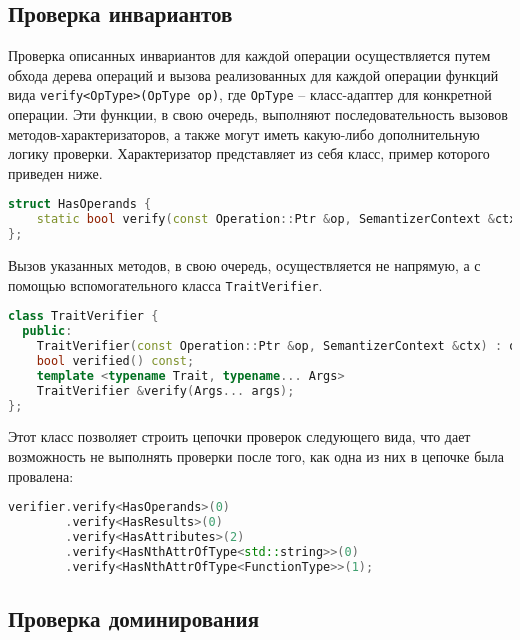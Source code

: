 \subsection{Проверка инвариантов}

Проверка описанных инвариантов для каждой операции осуществляется путем обхода дерева операций и вызова реализованных для каждой операции функций вида \verb|verify<OpType>(OpType op)|, где \verb|OpType| -- класс-адаптер для конкретной операции.
Эти функции, в свою очередь, выполняют последовательность вызовов методов-характеризаторов, а также могут иметь какую-либо дополнительную логику проверки.
Характеризатор представляет из себя класс, пример которого приведен ниже.

\clearpage

\begin{lstlisting}[language=C++, caption=Пример класса-характеризатора]
struct HasOperands {
    static bool verify(const Operation::Ptr &op, SemantizerContext &ctx, size_t numOperands);
};
\end{lstlisting}

Вызов указанных методов, в свою очередь, осуществляется не напрямую, а с помощью вспомогательного класса \verb|TraitVerifier|.

\begin{lstlisting}[language=C++, caption=Интерфейс класса TraitVerifier]
class TraitVerifier {
  public:
    TraitVerifier(const Operation::Ptr &op, SemantizerContext &ctx) : op(op), ctx(ctx), acc(true){};
    bool verified() const;
    template <typename Trait, typename... Args>
    TraitVerifier &verify(Args... args);
};
\end{lstlisting}

Этот класс позволяет строить цепочки проверок следующего вида, что дает возможность не выполнять проверки после того, как одна из них в цепочке была провалена:

\begin{lstlisting}[language=C++, caption=Пример семантической верификации]
verifier.verify<HasOperands>(0)
        .verify<HasResults>(0)
        .verify<HasAttributes>(2)
        .verify<HasNthAttrOfType<std::string>>(0)
        .verify<HasNthAttrOfType<FunctionType>>(1);
\end{lstlisting}

\subsection{Проверка доминирования}

